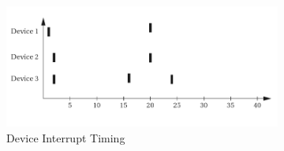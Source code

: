 \documentclass{article}
\begin{document}
\begin{figure}[h]
	\centering
	\caption{Three devices are attached to a microprocessor: Device 1 has highest priority and device 3 has lowest priority. Each device's interrupt handler takes 5 time unites to execute. Show what interrupt handler (if any) is executing at each time given the sequence of device interrupts displayed below.}
	\begin{subfigure}[t]{\textwidth}
		\centering
		\includegraphics[width=\textwidth,keepaspectratio]{Q3-19}
		\caption{Device Interrupt Timing}
	\end{subfigure}
\def\DA{Device 1}
\def\DB{Device 2}
\def\DC{Device 3}

	\begin{subfigure}[b]{\textwidth}
		\centering
\begin{tikzpicture}[every node/.style={font=\normalsize,minimum height=0.25cm,minimum width=0.5cm},]
	

\end{tikzpicture}
\end{subfigure}
\end{figure}
\end{document}
